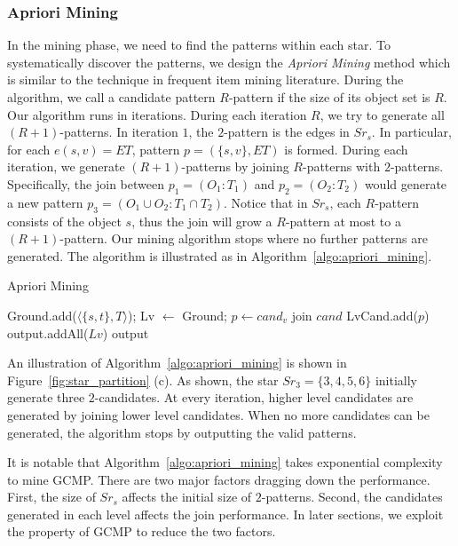 \subsubsection{Apriori Mining}
In the mining phase, we need to find the patterns within each star. 
To systematically discover the patterns, we design the \emph{Apriori Mining} method which
is similar to the technique in frequent item mining literature. During the algorithm, we call a candidate pattern $R$-pattern if the size of its object set is $R$. 
Our algorithm runs in iterations. During each iteration $R$, we try to generate all $(R+1)$-patterns. In iteration $1$, the $2$-pattern is the edges in $Sr_s$. In particular,
for each $e(s,v)=ET$, pattern $p=(\{s,v\}, ET)$ is formed. During each iteration, 
we generate $(R+1)$-patterns by joining $R$-patterns with $2$-patterns. Specifically,
the join between $p_1=(O_1:T_1)$ and $p_2=(O_2:T_2)$ would generate a new pattern $p_3=(O_1 \cup O_2:T_1 \cap T_2)$. Notice that in $Sr_s$, each $R$-pattern consists of the object $s$, thus the join will grow a $R$-pattern at most to a $(R+1)$-pattern.
Our mining algorithm stops where no further patterns are generated. The algorithm is illustrated as in Algorithm~\ref{algo:apriori_mining}.

\begin{algorithm}
\caption{Apriori Mining}
\label{algo:apriori_mining}
\begin{algorithmic}[1]
\State Ground.add($\langle \{s,t\}, T \rangle$);
\State Lv $\gets$ Ground;
\EndFor
{}
				\State $p \gets cand_v$ join $cand$
					\State LvCand.add($p$)
				\EndIf
			\EndFor
		\EndFor
		\EndIf
	\Else
	\EndIf
\EndWhile
\State output.addAll($Lv$)
\State \Return output
\end{algorithmic}
\end{algorithm}

An illustration of Algorithm~\ref{algo:apriori_mining} is shown in Figure~\ref{fig:star_partition} (c).
As shown, the star $Sr_3=\{3,4,5,6\}$ initially generate three $2$-candidates. At every iteration, 
higher level candidates are generated by joining lower level candidates. When no more candidates 
can be generated, the algorithm stops by outputting the valid patterns.

It is notable that Algorithm~\ref{algo:apriori_mining} takes exponential complexity to mine GCMP. There
are two major factors dragging down the performance. First, the size of $Sr_s$ affects
the initial size of $2$-patterns. Second, the candidates generated in each level affects the join performance. In later
sections, we exploit the property of GCMP to reduce the two factors.
